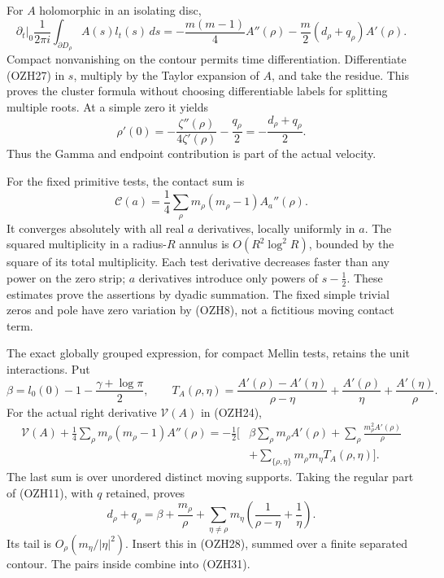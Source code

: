 \documentclass[
  10pt,
  a4paper,
]{article}
\begin{document}
For \(A\) holomorphic in an isolating disc, \[
\boxed{
\left.\partial_t\right|_0\frac1{2\pi i}
\int_{\partial D_\rho}A(s)l_t(s)\,ds
=-\frac{m(m-1)}4A''(\rho)
-\frac m2(d_\rho+q_\rho)A'(\rho).}
\tag{OZH28}
\] Compact nonvanishing on the contour permits time differentiation.
Differentiate (OZH27) in \(s\), multiply by the Taylor expansion of
\(A\), and take the residue. This proves the cluster formula without
choosing differentiable labels for splitting multiple roots. At a simple
zero it yields \[
\rho'(0)=-\frac{\zeta''(\rho)}{4\zeta'(\rho)}-\frac{q_\rho}{2}
=-\frac{d_\rho+q_\rho}{2}.
\tag{OZH29}
\] Thus the Gamma and endpoint contribution is part of the actual
velocity.

For the fixed primitive tests, the contact sum is \[
\mathcal C(a)=\frac14\sum_\rho m_\rho(m_\rho-1)A_a''(\rho).
\tag{OZH30}
\] It converges absolutely with all real \(a\) derivatives, locally
uniformly in \(a\). The squared multiplicity in a radius-\(R\) annulus
is \(O(R^2\log^2R)\), bounded by the square of its total multiplicity.
Each test derivative decreases faster than any power on the zero strip;
\(a\) derivatives introduce only powers of \(s-\frac12\). These
estimates prove the assertions by dyadic summation. The fixed simple
trivial zeros and pole have zero variation by (OZH8), not a fictitious
moving contact term.

The exact globally grouped expression, for compact Mellin tests, retains
the unit interactions. Put \[
\beta=l_0(0)-1-\frac{\gamma+\log\pi}{2},\qquad
T_A(\rho,\eta)=
\frac{A'(\rho)-A'(\eta)}{\rho-\eta}
+\frac{A'(\rho)}{\eta}+\frac{A'(\eta)}{\rho}.
\tag{OZH31}
\] For the actual right derivative \(\mathcal V(A)\) in (OZH24), \[
\begin{aligned}
\mathcal V(A)+\frac14\sum_\rho m_\rho(m_\rho-1)A''(\rho)
=-\frac12\bigg[&
\beta\sum_\rho m_\rho A'(\rho)
+\sum_\rho\frac{m_\rho^2A'(\rho)}{\rho}\\
&+\sum_{\{\rho,\eta\}}m_\rho m_\eta T_A(\rho,\eta)\bigg].
\end{aligned}\tag{OZH32}
\] The last sum is over unordered distinct moving supports. Taking the
regular part of (OZH11), with \(q\) retained, proves \[
d_\rho+q_\rho=\beta+\frac{m_\rho}{\rho}
+\sum_{\eta\ne\rho}m_\eta
\left(\frac1{\rho-\eta}+\frac1\eta\right).
\tag{OZH33}
\] Its tail is \(O_\rho(m_\eta/|\eta|^2)\). Insert this in (OZH28),
summed over a finite separated contour. The pairs inside combine into
(OZH31).
\end{document}
